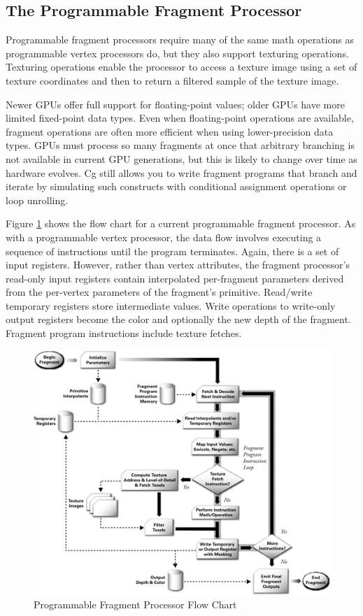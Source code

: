 \documentclass{book}
\begin{document}
\subsection*{The Programmable Fragment Processor}

Programmable fragment processors require many of the same math operations as programmable vertex processors do, but they also support texturing operations. Texturing operations enable the processor to access a texture image using a set of texture coordinates and then to return a filtered sample of the texture image.

Newer GPUs offer full support for floating-point values; older GPUs have more limited fixed-point data types. Even when floating-point operations are available, fragment operations are often more efficient when using lower-precision data types. GPUs must process so many fragments at once that arbitrary branching is not available in current GPU generations, but this is likely to change over time as hardware evolves. Cg still allows you to write fragment programs that branch and iterate by simulating such constructs with conditional assignment operations or loop unrolling.

Figure \ref{fig:1-9} shows the flow chart for a current programmable fragment processor. As with a programmable vertex processor, the data flow involves executing a sequence of instructions until the program terminates. Again, there is a set of input registers. However, rather than vertex attributes, the fragment processor's read-only input registers contain interpolated per-fragment parameters derived from the per-vertex parameters of the fragment's primitive. Read/write temporary registers store intermediate values. Write operations to write-only output registers become the color and optionally the new depth of the fragment. Fragment program instructions include texture fetches.

\begin{figure}
    \centering
    \includegraphics[width=1\linewidth]{Images/fig1_9.jpg}
    \caption{Programmable Fragment Processor Flow Chart}
    \label{fig:1-9}
\end{figure}
\end{document}

